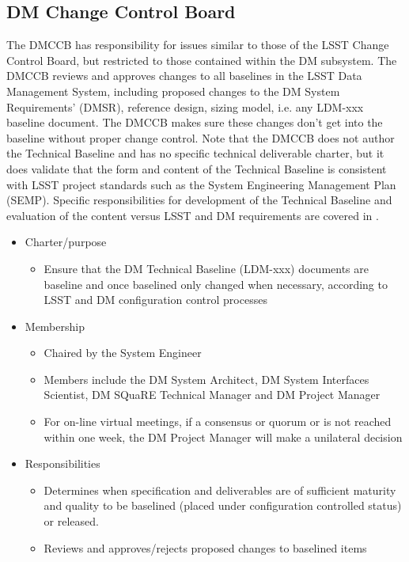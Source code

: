 \subsection{DM Change Control Board \label{sect:dmccb}}
The DMCCB has responsibility for issues similar to those of the LSST Change Control Board, but restricted to those contained within the DM subsystem.
The DMCCB reviews and approves changes to all baselines in the LSST Data Management System, including proposed changes to the DM System Requirements' (DMSR), reference design, sizing model, i.e. any LDM-xxx baseline document.
The DMCCB makes sure these changes don't get into the baseline without proper change control.
Note that the DMCCB does not author the Technical Baseline and has no specific technical deliverable charter, but it does validate that the form and content of the Technical Baseline is consistent with LSST project standards such as the System Engineering Management Plan (SEMP).
Specific responsibilities for development of the Technical Baseline and evaluation of the content versus LSST and DM requirements are covered in .
\begin{itemize}
\item Charter/purpose
	\begin{itemize}
	\item Ensure that the DM Technical Baseline (LDM-xxx) documents are baseline and once baselined only changed when necessary, according to LSST and DM configuration control processes
	\end{itemize}
\item Membership
	\begin{itemize}
	\item Chaired by the System Engineer
	\item Members include the DM System Architect, DM System Interfaces Scientist, DM SQuaRE Technical Manager and DM Project Manager
	\item For on-line virtual meetings, if a consensus or  quorum or is not reached within one week, the DM Project Manager will make a unilateral decision
	\end{itemize}
\item Responsibilities
	\begin{itemize}
	\item Determines when specification and deliverables are of sufficient maturity and quality to be baselined (placed under configuration controlled status) or released.
	\item Reviews and approves/rejects proposed changes to baselined items
	\end{itemize}
\end{itemize}

